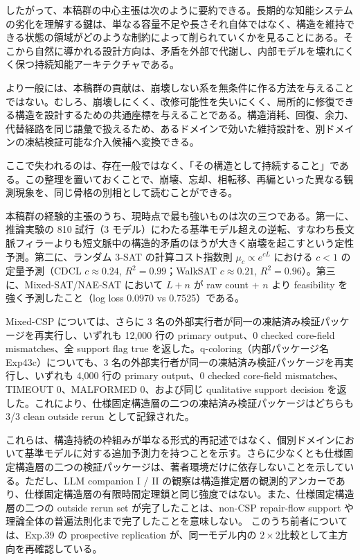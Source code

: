\documentclass[12pt,a4paper]{article}
\begin{document}
したがって、本稿群の中心主張は次のように要約できる。長期的な知能システムの劣化を理解する鍵は、単なる容量不足や長さそれ自体ではなく、構造を維持できる状態の領域がどのような制約によって削られていくかを見ることにある。そこから自然に導かれる設計方向は、矛盾を外部で代謝し、内部モデルを壊れにくく保つ持続知能アーキテクチャである。

より一般には、本稿群の貢献は、崩壊しない系を無条件に作る方法を与えることではない。むしろ、崩壊しにくく、改修可能性を失いにくく、局所的に修復できる構造を設計するための共通座標を与えることである。構造消耗、回復、余力、代替経路を同じ語彙で扱えるため、あるドメインで効いた維持設計を、別ドメインの凍結検証可能な介入候補へ変換できる。

ここで失われるのは、存在一般ではなく、「その構造として持続すること」である。この整理を置いておくことで、崩壊、忘却、相転移、再編といった異なる観測現象を、同じ骨格の別相として読むことができる。

本稿群の経験的主張のうち、現時点で最も強いものは次の三つである。第一に、推論実験の 810 試行（3 モデル）にわたる基準モデル超えの逆転、すなわち長文脈フィラーよりも短文脈中の構造的矛盾のほうが大きく崩壊を起こすという定性予測。第二に、ランダム 3-SAT の計算コスト指数則 \(\mu_c \propto e^{cL}\) における \(c < 1\) の定量予測（CDCL \(c \approx 0.24\), \(R^2 = 0.99\)；WalkSAT \(c \approx 0.21\), \(R^2 = 0.96\)）。第三に、Mixed-SAT/NAE-SAT において \(L+n\) が raw count + \(n\) より feasibility を強く予測したこと（log loss 0.0970 vs 0.7525）である。

Mixed-CSP については、さらに 3 名の外部実行者が同一の凍結済み検証パッケージを再実行し、いずれも 12,000 行の primary output、0 checked core-field mismatches、全 support flag true を返した。q-coloring（内部パッケージ名 Exp43c）についても、3 名の外部実行者が同一の凍結済み検証パッケージを再実行し、いずれも 4,000 行の primary output、0 checked core-field mismatches、TIMEOUT 0、MALFORMED 0、および同じ qualitative support decision を返した。これにより、仕様固定構造層の二つの凍結済み検証パッケージはどちらも 3/3 clean outside rerun として記録された。

これらは、構造持続の枠組みが単なる形式的再記述ではなく、個別ドメインにおいて基準モデルに対する追加予測力を持つことを示す。さらに少なくとも仕様固定構造層の二つの検証パッケージは、著者環境だけに依存しないことを示している。ただし、LLM companion I / II の観察は構造推定層の観測的アンカーであり、仕様固定構造層の有限時間定理鎖と同じ強度ではない。また、仕様固定構造層の二つの outside rerun set が完了したことは、non-CSP repair-flow support や理論全体の普遍法則化まで完了したことを意味しない。 このうち前者については、Exp.39 の prospective replication が、同一モデル内の \(2\times2\)比較として主方向を再確認している。
\end{document}

